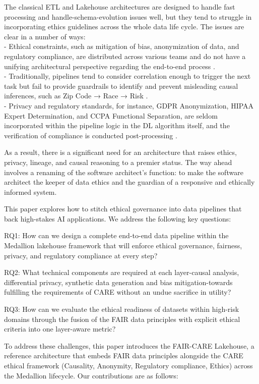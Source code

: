 The classical ETL and Lakehouse architectures are designed to handle fast processing and handle-schema-evolution issues well, but they tend to struggle in incorporating ethics guidelines across the whole data life cycle. The issues are clear in a number of ways:\\
- Ethical constraints, such as mitigation of bias, anonymization of data, and regulatory compliance, are distributed across various teams and do not have a unifying architectural perspective regarding the end-to-end process .\\
- Traditionally, pipelines tend to consider correlation enough to trigger the next task but fail to provide guardrails to identify and prevent misleading causal inferences, such as Zip Code → Race → Risk .\\
- Privacy and regulatory standards, for instance, GDPR Anonymization, HIPAA Expert Determination, and CCPA Functional Separation, are seldom incorporated within the pipeline logic in the DL algorithm itself, and the verification of compliance is conducted post-processing .

As a result, there is a significant need for an architecture that raises ethics, privacy, lineage, and causal reasoning to a premier status.
The way ahead involves a renaming of the software architect’s function: to make the software architect the keeper of data ethics and the guardian of a responsive and ethically informed system.

This paper explores how to stitch ethical governance into data pipelines that back high-stakes AI applications. We address the following key questions:

RQ1: How can we design a complete end-to-end data pipeline within the Medallion lakehouse framework that will enforce ethical governance, fairness, privacy, and regulatory compliance at every step?

RQ2: What technical components are required at each layer-causal analysis, differential privacy, synthetic data generation and bias mitigation-towards fulfilling the requirements of CARE without an undue sacrifice in utility?

RQ3: How can we evaluate the ethical readiness of datasets within high-risk domains through the fusion of the FAIR data principles with explicit ethical criteria into one layer-aware metric?

To address these challenges, this paper introduces the FAIR-CARE Lakehouse, a reference architecture that embeds FAIR data principles alongside the CARE ethical framework (Causality, Anonymity, Regulatory compliance, Ethics) across the Medallion lifecycle. Our contributions are as follows:

